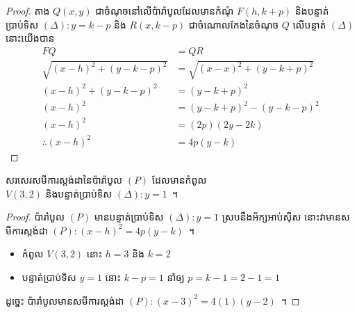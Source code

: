 \begin{figure}[H]
\begin{subfigure}[t]{.5\textwidth}
	\end{subfigure}
\end{figure}
%
\begin{proof}
	តាង $ Q(x,y) $ ជាចំណុចនៅលើប៉ារ៉ាបូលដែលមានកំណុំ $ F(h,k+p) $ និងបន្ទាត់ប្រាប់ទិស $ (\Delta):y=k-p $ និង $ R(x,k-p) $ ជាចំណោលកែងនៃចំណុច $ Q $ លើបន្ទាត់ $ (\Delta) $ នោះយើងបាន
	\begin{align*}
		FQ &= QR\\
		\sqrt{(x-h)^2+(y-k-p)^2} &= \sqrt{(x-x)^2+(y-k+p)^2}\\
		(x-h)^2+(y-k-p)^2 &= (y-k+p)^2\\
		(x-h)^2 &= (y-k+p)^2-(y-k-p)^2\\
		(x-h)^2 &= (2p)(2y-2k)\\
		\therefore (x-h)^2 &= 4p(y-k)
	\end{align*}
\end{proof}
%
\begin{example}
	សរសេរសមីការស្តង់ដានៃប៉ារ៉ាបូល $ (P) $ ដែលមានកំពូល\\ $ V(3,2) $ និងបន្ទាត់ប្រាប់ទិស $ (\Delta):y=1 $~។
\end{example}
%
\begin{proof}
	ប៉ារ៉ាបូល $ (P) $ មានបន្ទាត់ប្រាប់ទិស $ (\Delta):y=1 $ ស្របនឹងអ័ក្សអាប់ស៊ីស​ នោះវាមានសមីការស្តង់ដា $ (P):(x-h)^2=4p(y-k) $~។
	\begin{itemize}
		\item កំពូល $ V(3,2) $ នោះ $ h=3 $ និង $ k=2 $
		\item បន្ទាត់ប្រាប់ទិស $ y=1 $ នោះ $ k-p=1 $ នាំឲ្យ $ p=k-1=2-1=1 $
	\end{itemize}
	ដូច្នេះ ប៉ារ៉ាបូលមានសមីការស្តង់ដា $ (P):(x-3)^2=4(1)(y-2) $~។
\end{proof}
